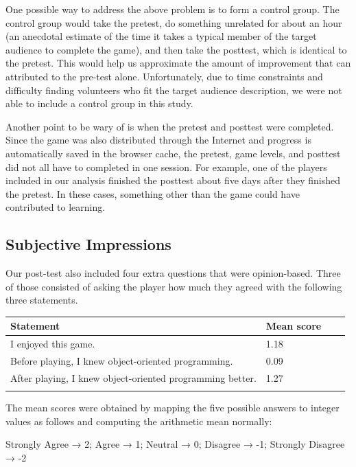 \documentclass[12pt,notitlepage]{article}
\begin{document}
One possible way to address the above problem is to form a control group.
The control group would take the pretest, do something unrelated for about
an hour (an anecdotal estimate of the time it takes a typical member of the
target audience to complete the game), and then take the posttest, which is
identical to the pretest. This would help us approximate the amount of
improvement that can attributed to the pre-test alone. Unfortunately, due to
time constraints and difficulty finding volunteers who fit the target audience
description, we were not able to include a control group in this study.

Another point to be wary of is when the pretest and posttest were completed.
Since the game was also distributed through the Internet and progress is
automatically saved in the browser cache, the pretest, game levels, and
posttest did not all have to completed in one session. For example, one of the
players included in our analysis finished the posttest about five days after
they finished the pretest. In these cases, something other than the game could
have contributed to learning.

\subsection{Subjective Impressions}

Our post-test also included four extra questions that were opinion-based.
Three of those consisted of asking the player how much they agreed with
the following three statements.

\begin{tabu}{Xlll}
\toprule
Statement & Mean score \\
\midrule
I enjoyed this game. & 1.18 \\
Before playing, I knew object-oriented programming. & 0.09 \\
After playing, I knew object-oriented programming better. & 1.27\\
\bottomrule
\\
\end{tabu}

The mean scores were obtained by mapping the five possible answers to integer
values as follows and computing the arithmetic mean normally:\\
\centerline{Strongly Agree → 2; Agree → 1; Neutral → 0; Disagree → -1; Strongly Disagree → -2}
\end{document}
